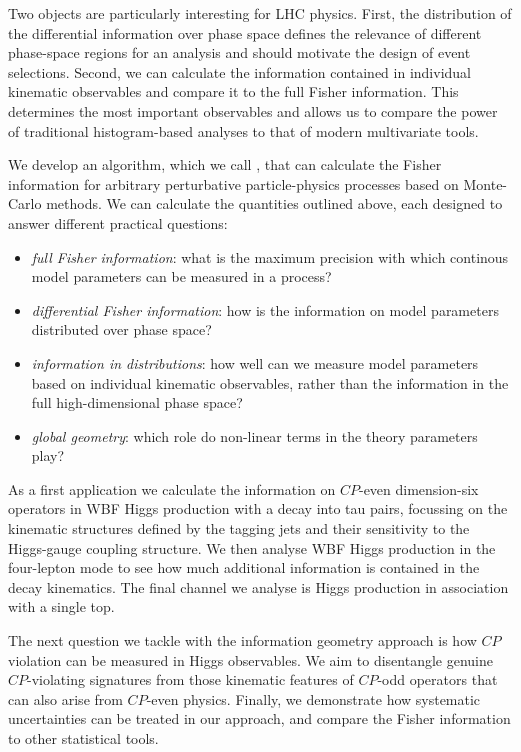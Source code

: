 Two objects are particularly interesting for LHC physics.  First, the
distribution of the differential information over phase space defines
the relevance of different phase-space regions for an analysis and
should motivate the design of event selections. Second, we can
calculate the information contained in individual kinematic
observables and compare it to the full Fisher information. This
determines the most important observables and allows us to compare the
power of traditional histogram-based analyses to that of modern
multivariate tools.

We develop an algorithm, which we call , that can
calculate the Fisher information for arbitrary perturbative
particle-physics processes based on Monte-Carlo methods. We can
calculate the quantities outlined above, each designed to answer
different practical questions:
%
\begin{itemize}
\item \emph{full Fisher information}: what is the maximum precision
  with which continous model parameters can be measured in a process?
\item \emph{differential Fisher information}: how is the information
  on model parameters distributed over phase space?
\item \emph{information in distributions}: how well can we measure
  model parameters based on individual kinematic observables, rather
  than the information in the full high-dimensional phase space?
\item \emph{global geometry}: which role do non-linear terms in the
  theory parameters play?
\end{itemize}

\newparagraph
%
As a first application we calculate the information on $CP$-even
dimension-six operators in WBF Higgs production with a decay into tau
pairs, focussing on the kinematic structures defined by the tagging
jets and their sensitivity to the Higgs-gauge coupling structure. We
then analyse WBF Higgs production in the four-lepton mode to see how
much additional information is contained in the decay kinematics. The
final channel we analyse is Higgs production in association with a
single top.

The next question we tackle with the information geometry approach is
how $CP$ violation can be measured in Higgs observables. We aim to
disentangle genuine $CP$-violating signatures from those kinematic
features of $CP$-odd operators that can also arise from $CP$-even
physics. Finally, we demonstrate how systematic uncertainties can be
treated in our approach, and compare the Fisher information to other
statistical tools.

